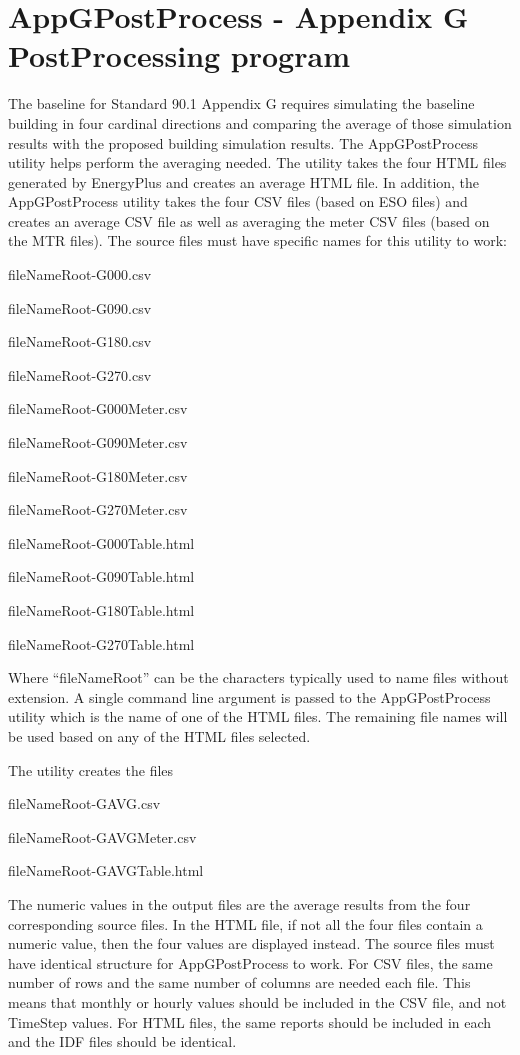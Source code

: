 \chapter{AppGPostProcess - Appendix G PostProcessing program}\label{appgpostprocess---appendix-g-postprocessing-program}

The baseline for Standard 90.1 Appendix G requires simulating the baseline building in four cardinal directions and comparing the average of those simulation results with the proposed building simulation results. The AppGPostProcess utility helps perform the averaging needed. The utility takes the four HTML files generated by EnergyPlus and creates an average HTML file. In addition, the AppGPostProcess utility takes the four CSV files (based on ESO files) and creates an average CSV file as well as averaging the meter CSV files (based on the MTR files). The source files must have specific names for this utility to work:

fileNameRoot-G000.csv

fileNameRoot-G090.csv

fileNameRoot-G180.csv

fileNameRoot-G270.csv

fileNameRoot-G000Meter.csv

fileNameRoot-G090Meter.csv

fileNameRoot-G180Meter.csv

fileNameRoot-G270Meter.csv

fileNameRoot-G000Table.html

fileNameRoot-G090Table.html

fileNameRoot-G180Table.html

fileNameRoot-G270Table.html

Where ``fileNameRoot'' can be the characters typically used to name files without extension. A single command line argument is passed to the AppGPostProcess utility which is the name of one of the HTML files. The remaining file names will be used based on any of the HTML files selected.

The utility creates the files

fileNameRoot-GAVG.csv

fileNameRoot-GAVGMeter.csv

fileNameRoot-GAVGTable.html

The numeric values in the output files are the average results from the four corresponding source files. In the HTML file, if not all the four files contain a numeric value, then the four values are displayed instead. The source files must have identical structure for AppGPostProcess to work. For CSV files, the same number of rows and the same number of columns are needed each file. This means that monthly or hourly values should be included in the CSV file, and not TimeStep values. For HTML files, the same reports should be included in each and the IDF files should be identical.

